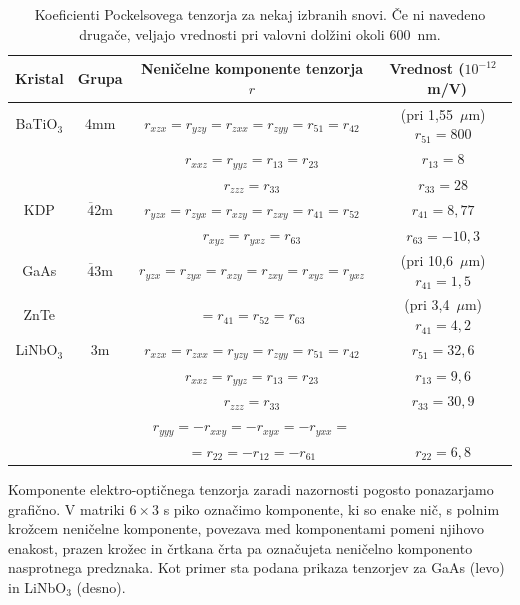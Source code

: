 \begin{table}[h!]
 \centering
\begin{tabular}{|c|c|c|c|} \hline  
      Kristal & Grupa & Neničelne komponente tenzorja $r$ & Vrednost ($10^{-12}$~m/V)\\ \hline
      BaTiO$_3$\index{BaTiO$_3$} & 4mm & $r_{xzx} = r_{yzy} = r_{zxx} = r_{zyy} = 
      r_{51} = r_{42}$  &
	    (pri 1,55~$\mu$m) $r_{51} = 800$ \\
	      & & $r_{xxz} = r_{yyz} = r_{13} = r_{23}$ &  $r_{13} = 8$ \\
	      & & $r_{zzz} = r_{33}$ & $r_{33} = 28$ \\ \hline
      KDP\index{KDP} & 
      $\overline{4}$2m & $r_{yzx} = r_{zyx} = r_{xzy} = r_{zxy} = r_{41} = r_{52}$  &
	    $r_{41} = 8,77$ \\
	    & & $r_{xyz} = r_{yxz} = r_{63}$ &  $r_{63} = -10,3$ \\ \hline
      GaAs\index{GaAs}\index{ZnTe} &  $\overline{4}$3m&
	  $r_{yzx} = r_{zyx} = r_{xzy} = r_{zxy} = r_{xyz} = r_{yxz}$  & (pri 10,6~$\mu$m) $r_{41} = 1,5$ \\
	ZnTe  & &   $= r_{41} = r_{52}=r_{63}$  &(pri 3,4~$\mu$m) $r_{41} = 4,2$ 
	    \\ \hline
      LiNbO$_3$\index{LiNbO$_3$} & 3m & $r_{xzx} = r_{zxx} = r_{yzy} = r_{zyy} = r_{51} = r_{42}$  &
	    $r_{51} = 32,6$ \\
	     & & $r_{xxz} = r_{yyz} = r_{13} = r_{23}$ &  $r_{13} = 9,6$ \\
	      & & $r_{zzz} = r_{33}$ & $r_{33} = 30,9$ \\
	    & &  $r_{yyy} = - r_{xxy} = -r_{xyx} = -r_{yxx}  = $ & \\
	    & &  $=r_{22} =  -r_{12} =-r_{61} $  &
	    $r_{22}  = 6,8$ \\
\hline 
\end{tabular}
  \caption{Koeficienti Pockelsovega tenzorja za nekaj izbranih snovi. Če ni navedeno drugače, veljajo
  vrednosti pri valovni dolžini okoli 600~nm.}
\label{table:Pockels}
\end{table}

\begin{remark}
Komponente elektro-optičnega tenzorja zaradi nazornosti pogosto ponazarjamo grafično. V matriki $6\times 3$
s piko označimo komponente, ki so enake nič, s polnim krožcem neničelne komponente, povezava med 
komponentami pomeni njihovo enakost, prazen krožec in črtkana črta pa označujeta 
neničelno komponento nasprotnega predznaka. Kot primer sta podana prikaza tenzorjev za 
GaAs (levo) in LiNbO$_3$ (desno).
\begin{figure}[h!]
\centering
\def\svgwidth{20truemm} 
\qquad \qquad
\def\svgwidth{20truemm} 

\end{figure}
\end{remark}

